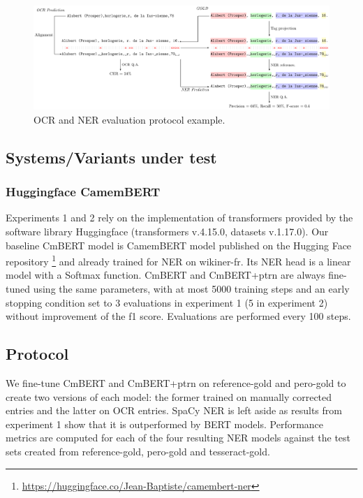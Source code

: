\begin{figure}[tb]
    \includegraphics[width=\linewidth]{figs/eval-ocr-ner.pdf}
    \caption{OCR and NER evaluation protocol example.}
    \label{fig.eval-ocr-ner}
\end{figure}



\subsection{Systems/Variants under test}


\subsubsection{Huggingface CamemBERT}

Experiments 1 and 2 rely on the implementation of transformers provided by the software library Huggingface (transformers v.4.15.0, datasets v.1.17.0).
Our baseline CmBERT model is CamemBERT model published on the Hugging Face repository \footnote{\url{https://huggingface.co/Jean-Baptiste/camembert-ner}} and already trained for NER on wikiner-fr.
Its NER head is a linear model with a Softmax function.
CmBERT and CmBERT+ptrn are always fine-tuned using the same parameters, with at most 5000 training steps and an early stopping condition set to 3 evaluations in experiment 1 (5 in experiment 2) without improvement of the f1 score. Evaluations are performed every 100 steps.

\subsection{Protocol}

We fine-tune CmBERT and CmBERT+ptrn on reference-gold and pero-gold to create two versions of each model: the former trained on manually corrected entries and the latter on OCR entries.
SpaCy NER is left aside as results from experiment 1 show that it is outperformed by BERT models.
Performance metrics are computed for each of the four resulting NER models against the test sets created from reference-gold, pero-gold and tesseract-gold.


